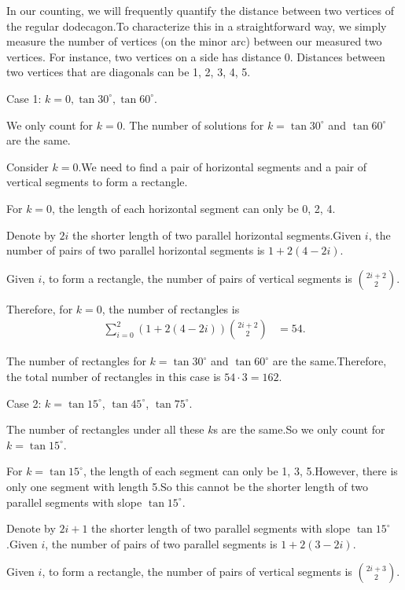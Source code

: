 \begin{enumerate}
 In our counting, we will frequently quantify the distance between two vertices of the regular dodecagon.To characterize this in a straightforward way, we simply measure the number of vertices (on the minor arc) between our measured two vertices. For instance, two vertices on a side has distance 0. Distances between two vertices that are diagonals can be 1, 2, 3, 4, 5.

 Case 1: $k = 0, \tan 30^\circ, \tan 60^\circ$.

 We only count for $k = 0$. The number of solutions for $k = \tan 30^\circ$ and $\tan 60^\circ$ are the same.

 Consider $k = 0$.We need to find a pair of horizontal segments and a pair of vertical segments to form a rectangle.

 For $k = 0$, the length of each horizontal segment can only be 0, 2, 4.

 Denote by $2i$ the shorter length of two parallel horizontal segments.Given $i$, the number of pairs of two parallel horizontal segments is $1 + 2 \left( 4 - 2 i \right)$.

 Given $i$, to form a rectangle, the number of pairs of vertical segments is $\binom{2i + 2}{2}$.

 Therefore, for $k = 0$, the number of rectangles is\begin{align*}\sum_{i=0}^2 \left( 1 + 2 \left( 4 - 2 i \right) \right)\binom{2i + 2}{2}& = 54 .\end{align*}


 The number of rectangles for $k = \tan 30^\circ$ and $\tan 60^\circ$ are the same.Therefore, the total number of rectangles in this case is $54 \cdot 3 = 162$.

 
Case 2: $k = \tan 15^\circ$, $\tan 45^\circ$, $\tan 75^\circ$.

 The number of rectangles under all these $k$s are the same.So we only count for $k = \tan 15^\circ$.

 For $k = \tan 15^\circ$, the length of each segment can only be 1, 3, 5.However, there is only one segment with length 5.So this cannot be the shorter length of two parallel segments with slope $\tan 15^\circ$.

 Denote by $2i + 1$ the shorter length of two parallel segments with slope $\tan 15^\circ$.Given $i$, the number of pairs of two parallel segments is $1 + 2 \left( 3 - 2 i \right)$.

 Given $i$, to form a rectangle, the number of pairs of vertical segments is $\binom{2i + 3}{2}$.


\end{enumerate}
